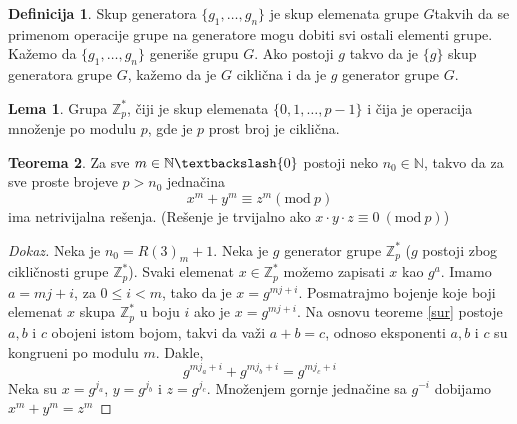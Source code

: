 \documentclass{article}
\theoremstyle{definition}
\newtheorem{definicija}{Definicija}[section]
\newtheorem{teorema}{Teorema}[section]
\newtheorem{lema}[teorema]{Lema}
\newcommand{\dokaz}[1]{\begin{proof}[Dokaz]#1\end{proof}}
\begin{document}
	\begin{definicija}
		Skup generatora $\{g_1,\ldots,g_n\}$ je skup elemenata grupe $G$takvih da se primenom operacije grupe na generatore mogu dobiti svi ostali elementi grupe. Kažemo da $\{g_1,\ldots,g_n\}$ generiše grupu $G$. Ako postoji $g$ takvo da je $\{g\}$ skup generatora grupe $G$, kažemo da je $G$ ciklična i da je $g$ generator grupe $G$.
	\end{definicija}
	\begin{lema}
		Grupa $\mathbb{Z}_{p}^{*}$, čiji je skup elemenata $\{0,1,\ldots,p-1\}$ i čija je operacija množenje po modulu $p$, gde je $p$ prost broj je ciklična.
	\end{lema}
	\begin{teorema} \label{sur2}
		Za sve $m \in \mathbb{N} \textbackslash \{0\}$ postoji neko $n_{0} \in \mathbb{N}$, takvo da za sve proste brojeve $p>n_{0}$ jednačina
		\[
		x^{m}+y^{m}\equiv z^{m} (\mathrm{mod} \: p) 
		\]
		ima netrivijalna rešenja. (Rešenje je trvijalno ako $x\cdot y \cdot z\equiv 0\: (\mathrm{mod} \: p)$)
	\end{teorema}
	\dokaz{
		Neka je $n_0=R(3)_m+1$. Neka je $g$ generator grupe $\mathbb{Z}_{p}^{*} $ ($g$ postoji zbog cikličnosti grupe $\mathbb{Z}_{p}^{*}$). Svaki elemenat $x\in\mathbb{Z}_{p}^{*}$ možemo zapisati $x$ kao $g^a$. Imamo $a=mj+i$, za $0\leq i < m$, tako da je $x=g^{mj+i}$. Posmatrajmo bojenje koje boji elemenat $x$ skupa $\mathbb{Z}_{p}^{*}$ u boju $i$ ako je $x=g^{mj+i}$. Na osnovu teoreme \ref{sur} postoje $a, b$ i $c$ obojeni istom bojom, takvi da važi $a+b=c$, odnoso eksponenti $a, b$ i $c$ su kongrueni po modulu $m$. Dakle,
		\[
		g^{mj_{a}+i}+g^{mj_{b}+i}=g^{mj_{c}+i}
		\]
		Neka su $x=g^{j_{a}}$, $y=g^{j_{b}}$ i $z=g^{j_{c}}$. Množenjem gornje jednačine sa $g^{-i}$ dobijamo $x^m+y^m=z^m$  
	}
\end{document}
